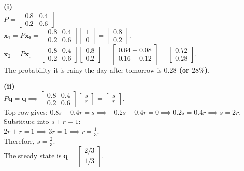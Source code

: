 \begin{solution}
\textbf{(i)} \\
$P = \begin{bmatrix} 0.8 & 0.4 \\ 0.2 & 0.6 \end{bmatrix}$ \\
$\mathbf{x}_1 = P \mathbf{x}_0 = \begin{bmatrix} 0.8 & 0.4 \\ 0.2 & 0.6 \end{bmatrix} \begin{bmatrix} 1 \\ 0 \end{bmatrix} = \begin{bmatrix} 0.8 \\ 0.2 \end{bmatrix}$. \\
$\mathbf{x}_2 = P \mathbf{x}_1 = \begin{bmatrix} 0.8 & 0.4 \\ 0.2 & 0.6 \end{bmatrix} \begin{bmatrix} 0.8 \\ 0.2 \end{bmatrix} = \begin{bmatrix} 0.64 + 0.08 \\ 0.16 + 0.12 \end{bmatrix} = \begin{bmatrix} 0.72 \\ 0.28 \end{bmatrix}$. \\
The probability it is rainy the day after tomorrow is \textbf{$0.28$ (or $28\%$)}.

\medskip
\textbf{(ii)} \\
$P\mathbf{q} = \mathbf{q} \implies \begin{bmatrix} 0.8 & 0.4 \\ 0.2 & 0.6 \end{bmatrix} \begin{bmatrix} s \\ r \end{bmatrix} = \begin{bmatrix} s \\ r \end{bmatrix}$. \\
Top row gives: $0.8s + 0.4r = s \implies -0.2s + 0.4r = 0 \implies 0.2s = 0.4r \implies s = 2r$. \\
Substitute into $s + r = 1$: \\
$2r + r = 1 \implies 3r = 1 \implies r = \frac{1}{3}$. \\
Therefore, $s = \frac{2}{3}$. \\
The steady state is \textbf{$\mathbf{q} = \begin{bmatrix} 2/3 \\ 1/3 \end{bmatrix}$}.


\end{solution}
